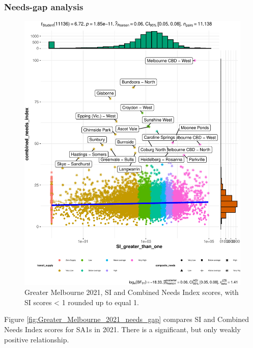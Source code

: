 \documentclass[preprint, 3p,
authoryear]{elsarticle} %
\begin{document}
\subsubsection{Needs-gap analysis}\label{needs-gap-analysis}

\begin{figure}
\centering
\includegraphics{Leveraging_GTFS_to_assess_transit_supply_Transport_Geography_files/figure-latex/Greater_Melbourne_2021_needs_gap-1.pdf}
\caption{Greater Melbourne 2021, SI and Combined Needs Index scores,
with SI scores \textless{} 1 rounded up to equal 1.}
\end{figure}

Figure \ref{fig:Greater_Melbourne_2021_needs_gap} compares SI and
Combined Needs Index scores for SA1s in 2021. There is a significant,
but only weakly positive relationship.
\end{document}
